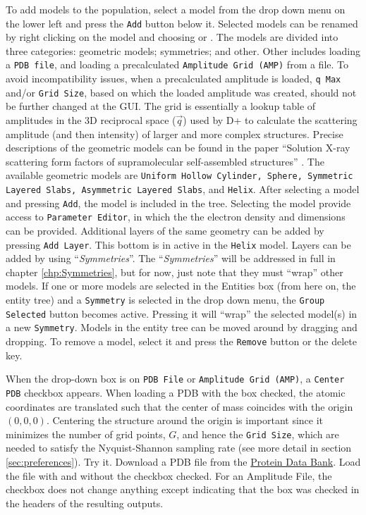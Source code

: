 \documentclass[../D+Manual.tex]{subfiles}
\begin{document}
To add models to the population, select a model from the drop down menu on the lower left and press the \texttt{Add} button below it. Selected models can be renamed by right clicking on the model and choosing  or . The models are divided into three categories: geometric models; symmetries; and other. Other includes loading a \texttt{PDB file}, and loading a precalculated \texttt{Amplitude Grid (AMP)} from a file. To avoid incompatibility issues, when a precalculated amplitude is loaded, \texttt{q Max} and/or \texttt{Grid Size}, based on which the loaded amplitude was created, should not be further changed at the GUI. The grid is essentially a lookup table of amplitudes in the 3D reciprocal space ($\vec{q}$) used by D+ to calculate the scattering amplitude (and then intensity) of larger and more complex structures. Precise descriptions of the geometric models can be found in the paper ``Solution X-ray scattering form factors of supramolecular self-assembled structures'' \textcite{szekely2010solution}. The available geometric models are \texttt{Uniform Hollow Cylinder, Sphere, Symmetric Layered Slabs, Asymmetric Layered Slabs}, and \texttt{Helix}. After selecting a model and pressing \texttt{Add}, the model is included in the tree. Selecting the model provide access to \texttt{Parameter Editor}, in which the the electron density and dimensions can be provided. Additional layers of the same geometry can be added by pressing \texttt{Add Layer}. This bottom is in active in the \texttt{Helix} model. Layers can be added by using ``\textit{Symmetries}''.  The ``\textit{Symmetries}'' will be addressed in full in chapter \ref{chp:Symmetries}, but for now, just note that they must ``wrap'' other models. If one or more models are selected in the Entities box (from here on, the entity tree) and a \texttt{Symmetry} is selected in the drop down menu, the \texttt{Group Selected} button becomes active. Pressing it will ``wrap'' the selected model(s) in a new \texttt{Symmetry}. Models in the entity tree can be moved around by dragging and dropping. To remove a model, select it and press the \texttt{Remove} button or the delete key.

When the drop-down box is on \texttt{PDB File} or \texttt{Amplitude Grid (AMP)}, a \texttt{Center PDB} checkbox appears.
When loading a PDB with the box checked, the atomic coordinates are translated such that the center of mass coincides with the origin $\left(0,0,0\right)$. 
Centering the structure around the origin is important since it minimizes the number of grid points, $G$, and hence the \texttt{Grid Size}, which  are needed to satisfy the Nyquist-Shannon sampling rate (see more detail in section \ref{sec:preferences}).
Try it.
Download a PDB file from the \href{http://www.rcsb.org/pdb/home/home.do}{Protein Data Bank}.
Load the file with and without the checkbox checked. For an Amplitude File, the checkbox does not change anything except indicating that the box was checked in the headers of the resulting outputs.
\end{document}

